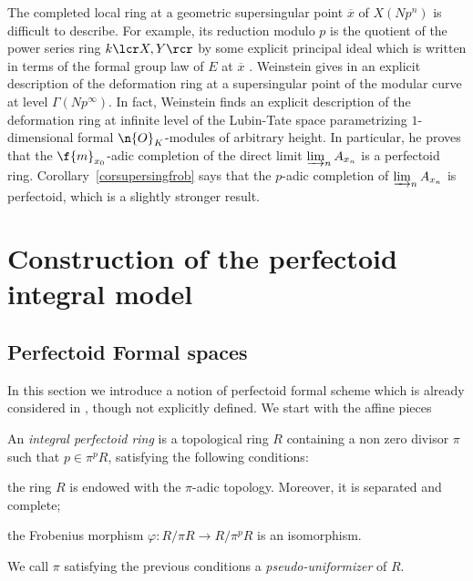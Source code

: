\begin{remark}
The completed local ring at a geometric supersingular point $\overline{x}$ of $X(Np^n)$ is difficult to describe. For example, its reduction modulo $p$ is the quotient of the power series ring $k\lcr X,Y\rcr$ by some explicit principal ideal which is written in terms of the formal group law of $E$ at $\overline{x}$ \cite[Th.\,13.8.4]{katz1985arithmetic}. Weinstein gives in \cite{MR3529120} an explicit description of the deformation ring at a supersingular point of the modular curve at level $\Gamma(Np^\infty)$. In fact, Weinstein finds an explicit description of the deformation ring at infinite level of the Lubin-Tate space parametrizing $1$\nobreakdash-dimensional formal $\n{O}_K$-modules of arbitrary height. In particular, he proves that the $\f{m}_{x_0}$-adic completion of the direct limit $\varinjlim_n A_{x_n}$ is a perfectoid ring. Corollary~\ref{corsupersingfrob} says that the $p$-adic completion of $\varinjlim_{n} A_{x_n}$ is perfectoid, which is a slightly stronger result.
\end{remark}

\section{Construction of the perfectoid integral model}
\label{Proof Theorem}

\subsection*{Perfectoid Formal spaces}

In this section we introduce a notion of perfectoid formal scheme which is already considered in \cite[Lem.\,3.10]{MR3905467}, though not explicitly defined. We start with the affine pieces

\begin{definition}
An \textit{integral perfectoid ring} is a topological ring $R$ containing a non zero divisor $\pi$ such that $p\in \pi^p R$, satisfying the following conditions:
\begin{enumeratei}

\item
the ring $R$ is endowed with the $\pi$-adic topology. Moreover, it is separated and complete;

\item
the Frobenius morphism $\varphi: R/\pi R\to R/\pi^{p}R$ is an isomorphism.
\end{enumeratei}
We call $\pi$ satisfying the previous conditions a \textit{pseudo-uniformizer} of $R$.
\end{definition}

